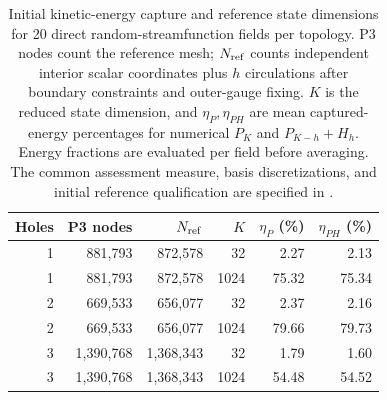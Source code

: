 \begin{table}[!htb]\centering\small
\caption{Initial kinetic-energy capture and reference state dimensions for 20 direct random-streamfunction fields per topology. P3 nodes count the reference mesh; $N_{\rm ref}$ counts independent interior scalar coordinates plus $h$ circulations after boundary constraints and outer-gauge fixing. $K$ is the reduced state dimension, and $\eta_P,\eta_{PH}$ are mean captured-energy percentages for numerical $P_K$ and $P_{K-h}+H_h$. Energy fractions are evaluated per field before averaging. The common assessment measure, basis discretizations, and initial reference qualification are specified in .}
\label{tab:random-historical-capacity}
\setlength{\tabcolsep}{4pt}
\begin{tabular}{rrrrrr}\toprule
Holes & P3 nodes & $N_{\rm ref}$ & $K$ & $\eta_P$ (\%) & $\eta_{PH}$ (\%)\\\midrule
1&881,793&872,578&32&2.27&2.13\\
1&881,793&872,578&1024&75.32&75.34\\
2&669,533&656,077&32&2.37&2.16\\
2&669,533&656,077&1024&79.66&79.73\\
3&1,390,768&1,368,343&32&1.79&1.60\\
3&1,390,768&1,368,343&1024&54.48&54.52\\
\bottomrule\end{tabular}\end{table}

